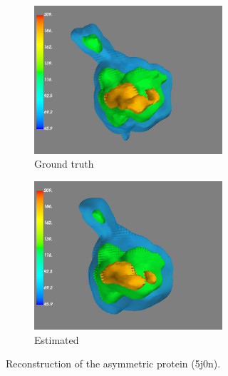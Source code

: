 \begin{figure}
    \centering
    \begin{subfigure}[b]{0.45\textwidth}
        \includegraphics[height=5.5cm]{images/5j0n_reconstruction_GT.png}
        \caption{Ground truth}
    \end{subfigure}
    \hfill
    \begin{subfigure}[b]{0.5\textwidth}
    \centering
        \includegraphics[height=5.5cm]{images/5j0n_reconstruction_noise0.png}
        \caption{Estimated}
    \end{subfigure}
    
    \caption{ Reconstruction of the asymmetric protein (5j0n).}
    \label{fig:reconstruction-noise0}
\end{figure}

